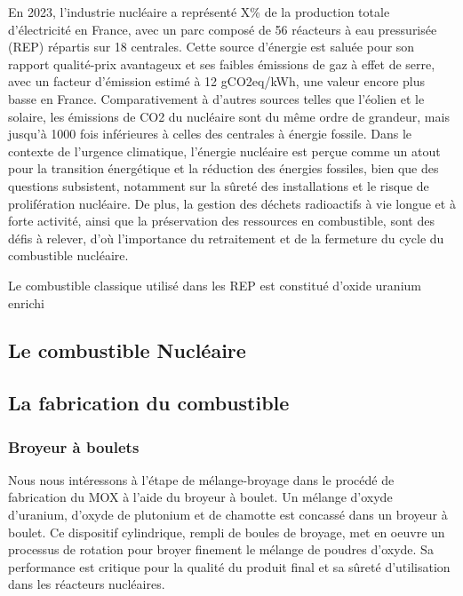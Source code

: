 En 2023, l'industrie nucléaire a représenté X\% de la production totale d'électricité en France, avec un parc composé de 56 réacteurs à eau pressurisée (REP) répartis sur 18 centrales. Cette source d'énergie est saluée pour son rapport qualité-prix avantageux et ses faibles émissions de gaz à effet de serre, avec un facteur d'émission estimé à 12 gCO2eq/kWh, une valeur encore plus basse en France. Comparativement à d'autres sources telles que l'éolien et le solaire, les émissions de CO2 du nucléaire sont du même ordre de grandeur, mais jusqu'à 1000 fois inférieures à celles des centrales à énergie fossile. Dans le contexte de l'urgence climatique, l'énergie nucléaire est perçue comme un atout pour la transition énergétique et la réduction des énergies fossiles, bien que des questions subsistent, notamment sur la sûreté des installations et le risque de prolifération nucléaire. De plus, la gestion des déchets radioactifs à vie longue et à forte activité, ainsi que la préservation des ressources en combustible, sont des défis à relever, d'où l'importance du retraitement et de la fermeture du cycle du combustible nucléaire.

Le combustible classique utilisé dans les REP est constitué d'oxide uranium enrichi
\subsection{Le combustible Nucléaire}

\subsection{La fabrication du combustible}

\subsubsection{Broyeur à boulets}

Nous nous intéressons à l'étape de mélange-broyage dans le procédé de fabrication du MOX à l'aide du broyeur à boulet. Un mélange d'oxyde d'uranium, d'oxyde de plutonium et de chamotte est concassé dans un broyeur à boulet. Ce dispositif cylindrique, rempli de boules de broyage, met en oeuvre un processus de rotation pour broyer finement le mélange de poudres d'oxyde. Sa performance est critique pour la qualité du produit final et sa sûreté d'utilisation dans les réacteurs nucléaires.